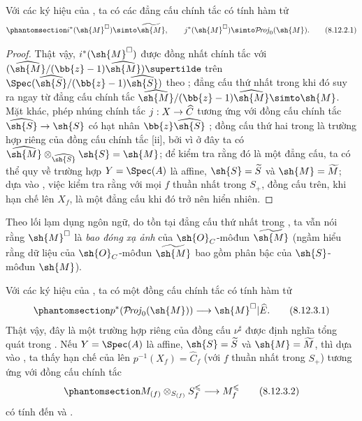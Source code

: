 \documentclass[oneside,10pt]{amsart}
\makeatletter
\renewcommand{\leq}{\leqslant}
\newcommand{\ega@arrow}[2]{\mathchoice{#1}{#2}{#2}{#2}}
\renewcommand{\to}{\ega@arrow{\longrightarrow}{\rightarrow}}
\def\shProj{\mathcal{P}\!\mathit{roj}}
\newcommand{\oldpage}[2][]{\marginnote{\normalfont\footnotesize\textbf{#1}~|~#2}\ignorespaces}
\let\EGAOriginalLabel\label
\renewcommand{\label}[1]{\phantomsection\EGAOriginalLabel{#1}}
\makeatother
\begin{document}
\begin{proposition}[8.12.2]
\label{II.8.12.2}
Với các ký hiệu của , ta có các đẳng cấu chính tắc có tính hàm tử
\[
\label{II.8.12.2.1}
  i^*(\sh{M}^{\square})\simto\widetilde{\sh{M}},
  \qquad
  j^*(\sh{M}^{\square})\simto\shProj_0(\sh{M}).
\tag{8.12.2.1}
\]
\end{proposition}

\begin{proof}
Thật vậy, $i^*(\sh{M}^{\square})$ được đồng nhất chính tắc với
$(\widehat{\sh{M}}/(\bb{z}-1)\widehat{\sh{M}})\supertilde$ trên
$\Spec(\widehat{\sh{S}}/(\bb{z}-1)\widehat{\sh{S}})$ theo ;
đẳng cấu thứ nhất trong  khi đó suy ra ngay  từ đẳng cấu chính tắc
$\widehat{\sh{M}}/(\bb{z}-1)\widehat{\sh{M}}\simto\sh{M}$.
Mặt khác, phép nhúng chính tắc $j:X\to\widehat{C}$ tương ứng với đồng cấu chính tắc $\widehat{\sh{S}}\to\sh{S}$ có hạt nhân $\bb{z}\widehat{\sh{S}}$ ;
đồng cấu thứ hai trong  là trường hợp riêng của đồng cấu chính tắc [ii], bởi vì ở đây ta có
$\widehat{\sh{M}}\otimes_{\widehat{\sh{S}}}\sh{S}=\sh{M}$;
để kiểm tra rằng đó là một đẳng cấu, ta có thể quy về trường hợp $Y=\Spec(A)$ là affine, $\sh{S}=\widetilde{S}$ và $\sh{M}=\widetilde{M}$;
dựa vào , việc kiểm tra rằng với mọi $f$ thuần nhất trong $S_+$, đồng cấu trên, khi hạn chế lên $X_f$, là một đẳng cấu khi đó trở nên hiển nhiên.
\end{proof}
\oldpage[II]{193}
Theo lối lạm dụng ngôn ngữ, do tồn tại đẳng cấu thứ nhất trong , ta vẫn nói rằng $\sh{M}^{\square}$ là \emph{bao đóng xạ ảnh} của $\sh{O}_C$-môđun $\widetilde{\sh{M}}$ (ngầm hiểu rằng dữ liệu của $\sh{O}_C$-môđun $\widetilde{\sh{M}}$ bao gồm phân bậc của $\sh{S}$-môđun $\sh{M}$).

\begin{env}[8.12.3]
\label{II.8.12.3}
Với các ký hiệu của , ta có một đồng cấu chính tắc có tính hàm tử
\[
\label{II.8.12.3.1}
  p^*(\shProj_0(\sh{M}))
  \to\sh{M}^{\square}|\widehat{E}.
\tag{8.12.3.1}
\]
Thật vậy, đây là một trường hợp riêng của đồng cấu $\nu^{\sharp}$ được định nghĩa tổng quát trong .
Nếu $Y=\Spec(A)$ là affine, $\sh{S}=\widetilde{S}$ và $\sh{M}=\widetilde{M}$, thì dựa vào , ta thấy hạn chế của  lên $p^{-1}(X_f)=\widehat{C}_f$ (với $f$ thuần nhất trong $S_+$) tương ứng với đồng cấu chính tắc
\[
\label{II.8.12.3.2}
  M_{(f)}\otimes_{S_{(f)}}S_f^{\leq}\to M_f^{\leq}
\tag{8.12.3.2}
\]
có tính đến  và .
\end{env}
\end{document}

